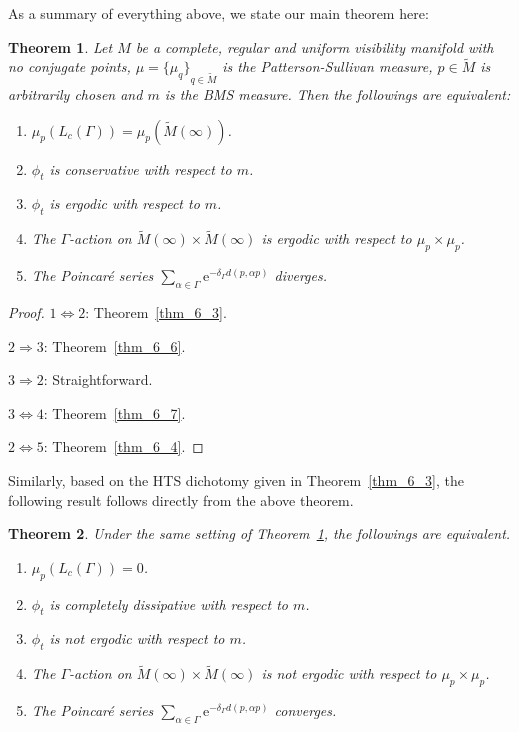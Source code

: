\documentclass[reqno,11pt]{article}
\newtheorem{theorem}{Theorem}[section]
\theoremstyle{definition}
\theoremstyle{remark}
\numberwithin{equation}{section}
\begin{document}
As a summary of everything above, we state our main theorem here:

\begin{theorem}\label{thm_6_8}
    Let $M$ be a complete, regular and uniform visibility manifold with no conjugate points, $\mu={\{\mu_q\}}_{q\in\widetilde{M}}$ is the Patterson-Sullivan measure, $p\in\widetilde{M}$ is arbitrarily chosen and $m$ is the BMS measure. Then the followings are equivalent:
	\begin{enumerate}
		\item[1.] $\mu_p(L_c(\Gamma))=\mu_p(\widetilde{M}(\infty))$.
		\item[2.] $\phi_t$ is conservative with respect to $m$.
		\item[3.] $\phi_t$ is ergodic with respect to $m$.
		\item[4.] The $\Gamma$-action on $\widetilde{M}(\infty)\times\widetilde{M}(\infty)$ is ergodic with respect to $\mu_p\times\mu_p$.
		\item[5.] The Poincar\'e series $\sum_{\alpha\in\Gamma}\mathrm{e}^{-\delta_\Gamma d(p,\alpha p)}$ diverges.
	\end{enumerate}
\end{theorem}

\begin{proof}
	$1\Leftrightarrow 2$: Theorem~\ref{thm_6_3}.

	$2\Rightarrow 3$: Theorem~\ref{thm_6_6}.

	$3\Rightarrow 2$: Straightforward.

	$3\Leftrightarrow 4$: Theorem~\ref{thm_6_7}.

	$2\Leftrightarrow 5$: Theorem~\ref{thm_6_4}.
\end{proof}

Similarly, based on the HTS dichotomy given in Theorem~\ref{thm_6_3}, the following result follows directly from the above theorem.

\begin{theorem}\label{thm_6_9}
	Under the same setting of Theorem~\ref{thm_6_8}, the followings are equivalent.
	\begin{enumerate}
		\item[1.] $\mu_p(L_c(\Gamma))=0$.
		\item[2.] $\phi_t$ is completely dissipative with respect to $m$.
		\item[3.] $\phi_t$ is not ergodic with respect to $m$.
		\item[4.] The $\Gamma$-action on $\widetilde{M}(\infty)\times\widetilde{M}(\infty)$ is not ergodic with respect to $\mu_p\times\mu_p$.
		\item[5.] The Poincar\'e series $\sum_{\alpha\in\Gamma}\mathrm{e}^{-\delta_\Gamma d(p,\alpha p)}$ converges.
	\end{enumerate}
\end{theorem}
\end{document}
